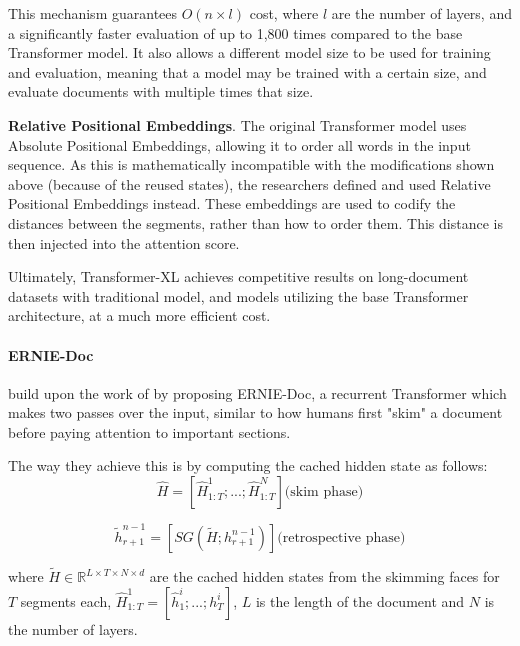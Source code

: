 \documentclass[preprint,review,12pt]{elsarticle}
\begin{document}
This mechanism guarantees $O(n \times l)$ cost, where $l$ are the number of layers, and a significantly faster evaluation of up to 1,800 times compared to the base Transformer model. It also allows a different model size to be used for training and evaluation, meaning that a model may be trained with a certain size, and evaluate documents with multiple times that size. %

\textbf{Relative Positional Embeddings}. The original Transformer model uses Absolute Positional Embeddings, allowing it to order all words in the input sequence. As this is mathematically incompatible with the modifications shown above (because of the reused states), the researchers defined and used Relative Positional Embeddings instead. These embeddings are used to codify the distances between the segments, rather than how to order them. This distance is then injected into the attention score. 

Ultimately, Transformer-XL achieves competitive results on long-document datasets with traditional model, and models utilizing the base Transformer architecture, at a much more efficient cost.


\paragraph{ERNIE-Doc} \citet{ernie-doc} build upon the work of \citet{dai-etal-2019-transformer} by proposing ERNIE-Doc, a recurrent Transformer which makes two passes over the input, similar to how humans first "skim" a document before paying attention to important sections.

The way they achieve this is by computing the cached hidden state as follows:
\begin{equation}
    \hat{H} = [\hat{H}^{1}_{1:T};...;\hat{H}^{N}_{1:T}] \text{(skim phase)}
\end{equation}

\begin{equation}
    \tilde{h}_{r+1}^{n-1} = [SG(\tilde{H};h_{r+1}^{n-1})] \text{(retrospective phase)}
\end{equation}

where $\tilde{H} \in \mathbb{R}^{L\times T\times N \times d}$ are the cached hidden states from the skimming faces for $T$ segments each, $\hat{H}^{1}_{1:T} = [\hat{h}^{i}_1;...;{h}^{i}_T]$, $L$ is the length of the document and $N$ is the number of layers.
\end{document}
